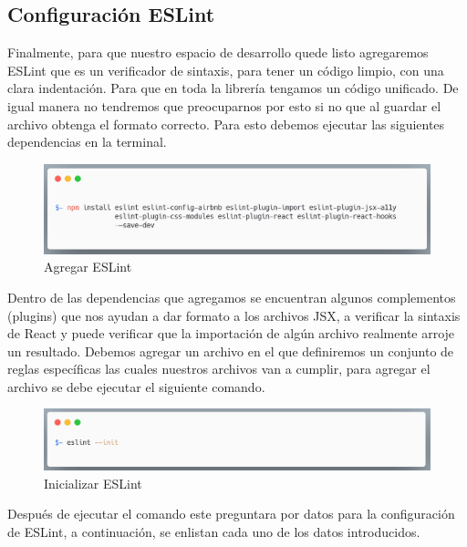     \subsection{Configuración ESLint }
    Finalmente, para que nuestro espacio de desarrollo quede listo agregaremos ESLint que es un verificador de sintaxis, para tener un código limpio, con una clara indentación. Para que en toda la librería tengamos un código unificado. De igual manera no tendremos que preocuparnos por esto si no que al guardar el archivo obtenga el formato correcto.
    Para esto debemos ejecutar las siguientes dependencias en la terminal.
    \newline
    \newline
     \begin{figure}[H]
    \includegraphics[width=1\textwidth]{./Imagenes/image14.png}
    \caption[Agregar ESLint]{Agregar ESLint}
    \end{figure}
    \newline
    \newline
    Dentro de las dependencias que agregamos se encuentran algunos complementos (plugins) que nos ayudan a dar formato a los archivos JSX, a verificar la sintaxis de React y  puede verificar que la importación de algún archivo realmente arroje un resultado.
    Debemos agregar un archivo en el que definiremos un conjunto de reglas específicas las cuales nuestros archivos van a cumplir, para agregar el archivo se debe ejecutar el siguiente comando.
    \newline
    \newline
     \begin{figure}[H]
    \includegraphics[width=1\textwidth]{./Imagenes/image32.png}
    \caption[Inicializar ESLint]{Inicializar ESLint}
    \end{figure}
    \newline
    \newline
    Después de ejecutar el comando este preguntara por datos para la configuración de ESLint, a continuación, se enlistan cada uno de los datos introducidos.
